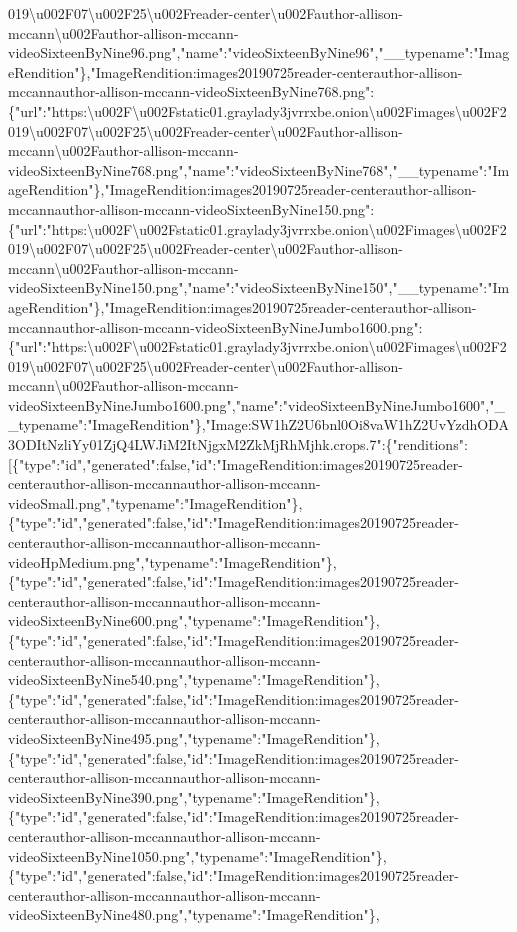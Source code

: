 019\textbackslash{}u002F07\textbackslash{}u002F25\textbackslash{}u002Freader-center\textbackslash{}u002Fauthor-allison-mccann\textbackslash{}u002Fauthor-allison-mccann-videoSixteenByNine96.png","name":"videoSixteenByNine96","\_\_typename":"ImageRendition"\},"ImageRendition:images20190725reader-centerauthor-allison-mccannauthor-allison-mccann-videoSixteenByNine768.png":\{"url":"https:\textbackslash{}u002F\textbackslash{}u002Fstatic01.graylady3jvrrxbe.onion\textbackslash{}u002Fimages\textbackslash{}u002F2019\textbackslash{}u002F07\textbackslash{}u002F25\textbackslash{}u002Freader-center\textbackslash{}u002Fauthor-allison-mccann\textbackslash{}u002Fauthor-allison-mccann-videoSixteenByNine768.png","name":"videoSixteenByNine768","\_\_typename":"ImageRendition"\},"ImageRendition:images20190725reader-centerauthor-allison-mccannauthor-allison-mccann-videoSixteenByNine150.png":\{"url":"https:\textbackslash{}u002F\textbackslash{}u002Fstatic01.graylady3jvrrxbe.onion\textbackslash{}u002Fimages\textbackslash{}u002F2019\textbackslash{}u002F07\textbackslash{}u002F25\textbackslash{}u002Freader-center\textbackslash{}u002Fauthor-allison-mccann\textbackslash{}u002Fauthor-allison-mccann-videoSixteenByNine150.png","name":"videoSixteenByNine150","\_\_typename":"ImageRendition"\},"ImageRendition:images20190725reader-centerauthor-allison-mccannauthor-allison-mccann-videoSixteenByNineJumbo1600.png":\{"url":"https:\textbackslash{}u002F\textbackslash{}u002Fstatic01.graylady3jvrrxbe.onion\textbackslash{}u002Fimages\textbackslash{}u002F2019\textbackslash{}u002F07\textbackslash{}u002F25\textbackslash{}u002Freader-center\textbackslash{}u002Fauthor-allison-mccann\textbackslash{}u002Fauthor-allison-mccann-videoSixteenByNineJumbo1600.png","name":"videoSixteenByNineJumbo1600","\_\_typename":"ImageRendition"\},"Image:SW1hZ2U6bnl0Oi8vaW1hZ2UvYzdhODA3ODItNzliYy01ZjQ4LWJiM2ItNjgxM2ZkMjRhMjhk.crops.7":\{"renditions":{[}\{"type":"id","generated":false,"id":"ImageRendition:images20190725reader-centerauthor-allison-mccannauthor-allison-mccann-videoSmall.png","typename":"ImageRendition"\},\{"type":"id","generated":false,"id":"ImageRendition:images20190725reader-centerauthor-allison-mccannauthor-allison-mccann-videoHpMedium.png","typename":"ImageRendition"\},\{"type":"id","generated":false,"id":"ImageRendition:images20190725reader-centerauthor-allison-mccannauthor-allison-mccann-videoSixteenByNine600.png","typename":"ImageRendition"\},\{"type":"id","generated":false,"id":"ImageRendition:images20190725reader-centerauthor-allison-mccannauthor-allison-mccann-videoSixteenByNine540.png","typename":"ImageRendition"\},\{"type":"id","generated":false,"id":"ImageRendition:images20190725reader-centerauthor-allison-mccannauthor-allison-mccann-videoSixteenByNine495.png","typename":"ImageRendition"\},\{"type":"id","generated":false,"id":"ImageRendition:images20190725reader-centerauthor-allison-mccannauthor-allison-mccann-videoSixteenByNine390.png","typename":"ImageRendition"\},\{"type":"id","generated":false,"id":"ImageRendition:images20190725reader-centerauthor-allison-mccannauthor-allison-mccann-videoSixteenByNine1050.png","typename":"ImageRendition"\},\{"type":"id","generated":false,"id":"ImageRendition:images20190725reader-centerauthor-allison-mccannauthor-allison-mccann-videoSixteenByNine480.png","typename":"ImageRendition"\},\